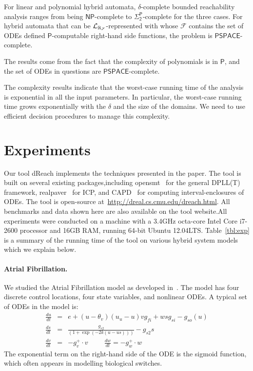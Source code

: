 \documentclass[10pt,envcountsect]{llncs}
\begin{document}
\begin{corollary}
For linear and polynomial hybrid automata, $\delta$-complete bounded reachability analysis ranges from being $\mathsf{NP}$-complete to $\mathsf{\Sigma_2^P}$-complete for the three cases. For hybrid automata that can be $\mathcal{L}_{\mathbb{R}_{\mathcal{F}}}$-represented with whose $\mathcal{F}$ contains the set of ODEs defined $\mathsf{P}$-computable right-hand side functions, the problem is $\mathsf{PSPACE}$-complete.
\end{corollary}
The results come from the fact that the complexity of polynomials is in $\mathsf{P}$, and the set of ODEs in questions are $\mathsf{PSPACE}$-complete.
\begin{remark}
The complexity results indicate that the worst-case running time of the analysis is exponential in all the input parameters. In particular, the worst-case running time grows exponentially with the $\delta$ and the size of the domains. We need to use efficient decision procedures to manage this complexity.
\end{remark}

\section{Experiments}


Our tool {\sf dReach} implements the techniques presented in the
paper. The tool is built on several existing packages,including {\sf
  opensmt}~\cite{DBLP:conf/tacas/BruttomessoPST10} for the general
DPLL(T) framework, {\sf
  realpaver}~\cite{DBLP:journals/toms/GranvilliersB06} for ICP, and
{\sf CAPD}~\cite{capd} for computing interval-enclosures of ODEs. The
tool is open-source at~\url{http://dreal.cs.cmu.edu/dreach.html}. All
benchmarks and data shown here are also available on the tool
website.All experiments were conducted on a machine with a 3.4GHz
octa-core Intel Core i7-2600 processor and 16GB RAM, running 64-bit
Ubuntu 12.04LTS. Table~\ref{tbl:exp} is a summary of the running time
of the tool on various hybrid system models which we explain below.

\paragraph{Atrial Fibrillation.} We studied the Atrial Fibrillation model as developed in~\cite{DBLP:conf/cav/GrosuBFGGSB11}. The model has four discrete control locations, four state variables, and nonlinear ODEs. A typical set of ODEs in the model is:
\begin{eqnarray*}
\frac{du}{dt} &=& e + (u-\theta_v)(u_u-u ) v g_{fi} + wsg_{si}-g_{so}(u)\\
\frac{ds}{dt} &=& \displaystyle\frac{g_{s2}}{(1+\exp(-2k(u-us)))} -  g_{s2}s\\
\frac{dv}{dt} &=& -g_v^+\cdot v \hspace{1cm} \frac{dw}{dt} = -g_w^+\cdot w
\end{eqnarray*}
The exponential term on the right-hand side of the ODE is the sigmoid function, which often appears in modelling biological switches.
\end{document}
